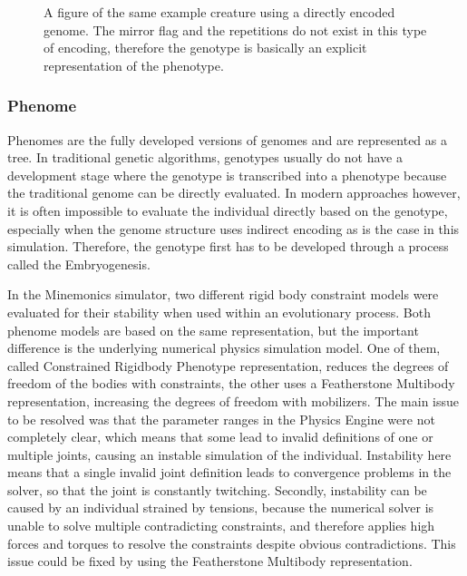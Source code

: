 \documentclass[main]{subfiles}
\begin{document}
\begin{figure}[H]
\centering


\caption[Example creature using a directly encoded genome]{A figure of the same example creature using a directly encoded genome. The mirror flag and the repetitions do not exist in this type of encoding, therefore the genotype is basically an explicit representation of the phenotype.}
\label{figure:direct-encoding}
\end{figure}

\subsubsection{Phenome}

Phenomes are the fully developed versions of genomes and are represented as a tree. %
%
In traditional genetic algorithms, genotypes usually do not have a development stage where the genotype is transcribed into a phenotype because the traditional genome can be directly evaluated. %
%
In modern approaches however, it is often impossible to evaluate the individual directly based on the genotype, especially when the genome structure uses indirect encoding as is the case in this simulation. %
%
Therefore, the genotype first has to be developed through a process called the Embryogenesis.

In the Minemonics simulator, two different rigid body constraint models were evaluated for their stability when used within an evolutionary process. %
%
Both phenome models are based on the same representation, but the important difference is the underlying numerical physics simulation model. %
%
One of them, called Constrained Rigidbody Phenotype representation, reduces the degrees of freedom of the bodies with constraints, the other uses a Featherstone Multibody representation, increasing the degrees of freedom with mobilizers. %
%
The main issue to be resolved was that the parameter ranges in the Physics Engine were not completely clear, which means that some lead to invalid definitions of one or multiple joints, causing an instable simulation of the individual. %
%
Instability here means that a single invalid joint definition leads to convergence problems in the solver, so that the joint is constantly twitching. %
%
Secondly, instability can be caused by an individual strained by tensions, because the numerical solver is unable to solve multiple contradicting constraints, and therefore applies high forces and torques to resolve the constraints despite obvious contradictions. %
%
This issue could be fixed by using the Featherstone Multibody representation. 
\end{document}
